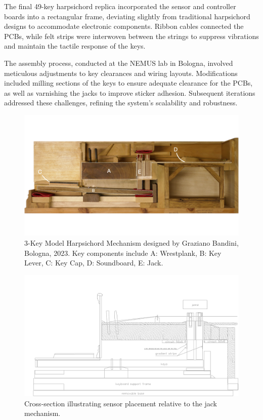 The final 49-key harpsichord replica incorporated the sensor and controller boards into a rectangular frame, deviating slightly from traditional harpsichord designs to accommodate electronic components. Ribbon cables connected the PCBs, while felt strips were interwoven between the strings to suppress vibrations and maintain the tactile response of the keys.

The assembly process, conducted at the NEMUS lab in Bologna, involved meticulous adjustments to key clearances and wiring layouts. Modifications included milling sections of the keys to ensure adequate clearance for the PCBs, as well as varnishing the jacks to improve sticker adhesion. Subsequent iterations addressed these challenges, refining the system’s scalability and robustness.

\begin{figure}
    \centering
    \includegraphics[width=\linewidth]{src/images/3-key-side-labelled.png}
    \caption{3-Key Model Harpsichord Mechanism designed by Graziano Bandini, Bologna, 2023. Key components include A: Wrestplank, B: Key Lever, C: Key Cap, D: Soundboard, E: Jack.}
    \label{fig:3key}
\end{figure}

\begin{figure}
    \centering
    \includegraphics[width=\linewidth]{src/images/CrossSectionSensorPlacement.jpg}
    \caption{Cross-section illustrating sensor placement relative to the jack mechanism.}
    \label{fig:cross-section}
\end{figure}

